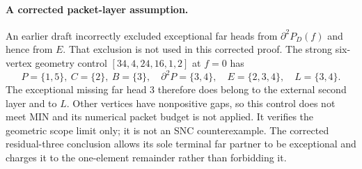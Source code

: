 \paragraph{A corrected packet-layer assumption.}
An earlier draft incorrectly excluded exceptional far heads from
$\partial^2P_D(f)$ and hence from $E$. That exclusion is not used
in this corrected proof. The strong six-vertex geometry control
$[34,4,24,16,1,2]$ at $f=0$ has
\[
 P=\{1,5\},\ C=\{2\},\ B=\{3\},\quad
 \partial^2P=\{3,4\},\quad E=\{2,3,4\},\quad L=\{3,4\}.
\]
The exceptional missing far head $3$ therefore does belong to the
external second layer and to $L$. Other vertices have nonpositive gaps,
so this control does not meet MIN and its numerical packet budget is
not applied. It verifies the geometric scope limit only; it is not
an SNC counterexample. The corrected residual-three conclusion allows
its sole terminal far partner to be exceptional and charges it to the
one-element remainder rather than forbidding it.

